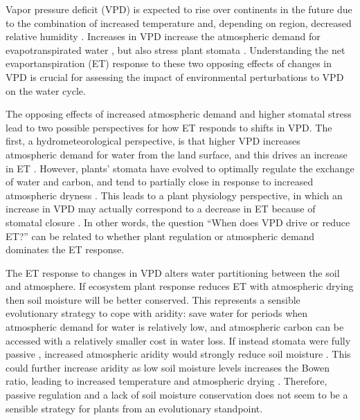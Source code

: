 Vapor pressure deficit (VPD) is expected to rise over continents in
the future due to the combination of increased temperature and,
depending on region, decreased relative humidity
\citep{Byrne_2013}. Increases in VPD increase the atmospheric demand
for evapotranspirated water \citep{Penman_1948, Monteith_1965}, but
also stress plant stomata \citep{Leuning_1990,
MEDLYN_2011}. Understanding the net evaportanspiration (ET) response
to these two opposing effects of changes in VPD is crucial for
assessing the impact of environmental perturbations to VPD on the
water cycle.

The opposing effects of increased atmospheric demand and higher
stomatal stress lead to two possible perspectives for how ET responds
to shifts in VPD. The first, a hydrometeorological perspective, is
that higher VPD increases atmospheric demand for water from the land
surface, and this drives an increase in ET
\citep{Penman_1948}. However, plants' stomata have evolved to
optimally regulate the exchange of water and carbon, and tend to
partially close in response to increased atmospheric dryness
\citep{Farquhar_1978, Ball_1987, Leuning_1990, Katul_2009, MEDLYN_2011}. This
leads to a plant physiology perspective, in which an increase in VPD
may actually correspond to a decrease in ET because of stomatal
closure \citep[e.g.][]{Rigden_2017}.  In other words, the question
``When does VPD drive or reduce ET?'' can be related to whether plant
regulation or atmospheric demand dominates the ET response.

The ET response to changes in VPD alters water partitioning between
the soil and atmosphere. If ecosystem plant response reduces ET with
atmospheric drying then soil moisture will be better conserved. This
represents a sensible evolutionary strategy to cope with aridity: save
water for periods when atmospheric demand for water is relatively low,
and atmospheric carbon can be accessed with a relatively smaller cost
in water loss. If instead stomata were fully passive \citep [similar
to soil pores, e.g. ][]{Or_2013}, increased atmospheric aridity would
strongly reduce soil moisture \citep{Berg_2017}. This could further
increase aridity as low soil moisture levels increases the Bowen
ratio, leading to increased temperature and atmospheric drying
\citep[][]{Bouchet_1963, Morton_1965, Brutsaert_1999, Ozdogan_2006,
Salvucci_2013, Gentine_2016, Berg_2016, Zhou_2019}. Therefore, passive
regulation and a lack of soil moisture conservation does not seem to
be a sensible strategy for plants from an evolutionary standpoint.

